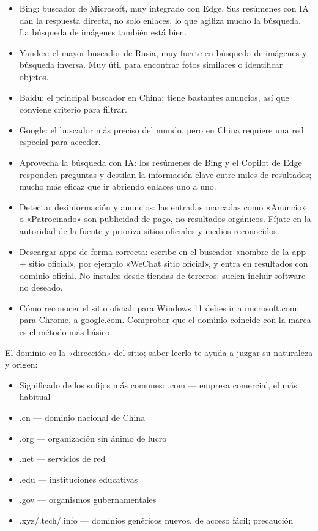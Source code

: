 \begin{itemize}
  \item Bing: buscador de Microsoft, muy integrado con Edge. Sus resúmenes con IA dan la respuesta directa, no solo enlaces, lo que agiliza mucho la búsqueda. La búsqueda de imágenes también está bien.
  \item Yandex: el mayor buscador de Rusia, muy fuerte en búsqueda de imágenes y búsqueda inversa. Muy útil para encontrar fotos similares o identificar objetos.
  \item Baidu: el principal buscador en China; tiene bastantes anuncios, así que conviene criterio para filtrar.
  \item Google: el buscador más preciso del mundo, pero en China requiere una red especial para acceder.
\end{itemize}


\begin{itemize}
  \item Aprovecha la búsqueda con IA: los resúmenes de Bing y el Copilot de Edge responden preguntas y destilan la información clave entre miles de resultados; mucho más eficaz que ir abriendo enlaces uno a uno.
  \item Detectar desinformación y anuncios: las entradas marcadas como «Anuncio» o «Patrocinado» son publicidad de pago, no resultados orgánicos. Fíjate en la autoridad de la fuente y prioriza sitios oficiales y medios reconocidos.
  \item Descargar apps de forma correcta: escribe en el buscador «nombre de la app + sitio oficial», por ejemplo «WeChat sitio oficial», y entra en resultados con dominio oficial. No instales desde tiendas de terceros: suelen incluir software no deseado.
  \item Cómo reconocer el sitio oficial: para Windows 11 debes ir a microsoft.com; para Chrome, a google.com. Comprobar que el dominio coincide con la marca es el método más básico.
\end{itemize}


El dominio es la «dirección» del sitio; saber leerlo te ayuda a juzgar su naturaleza y origen:

\begin{itemize}
  \item Significado de los sufijos más comunes: .com — empresa comercial, el más habitual
  \item .cn — dominio nacional de China
  \item .org — organización sin ánimo de lucro
  \item .net — servicios de red
  \item .edu — instituciones educativas
  \item .gov — organismos gubernamentales
  \item .xyz/.tech/.info — dominios genéricos nuevos, de acceso fácil; precaución
\end{itemize}

